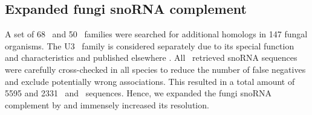 \newcommand{\TODO}[1] {\begingroup\color{red}#1\endgroup}

\subsection{Expanded fungi snoRNA complement}

A set of 68 \cd\ and 50 \haca\ families were searched for additional homologs in 
147 fungal organisms. The U3 \sno\ family is considered separately due to its 
special function and characteristics and published elsewhere \cite{Canzler:2017}. All \snostrip\ retrieved snoRNA sequences 
were carefully cross-checked in all species to reduce the number of false 
negatives and exclude potentially wrong associations. This resulted in a total 
amount of 5595 and 2331 \cd\ and \haca\ sequences. Hence, we expanded the fungi 
snoRNA complement by  and immensely increased its resolution. 

%

